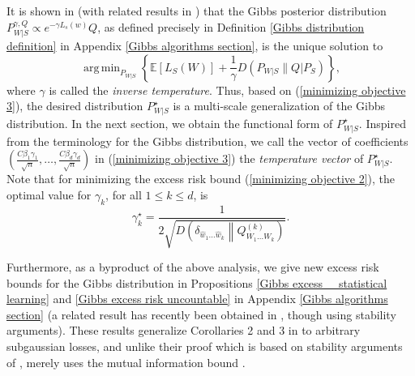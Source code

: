 \documentclass{article}
\DeclareMathOperator*{\argmin}{arg\,min}
\newcommand{\E}{\mathbb{E}}
\begin{document}
It is shown in \cite{xu2017information} (with related results in \cite{zhang2006information, rigollet2012sparse})  that the Gibbs posterior distribution $P^{\gamma,Q}_{W|S}\propto e^{-\gamma L_s(w)}Q$, as defined precisely 
in Definition \ref{Gibbs distribution definition} 
in Appendix \ref{Gibbs algorithms section}, is the unique solution to 
\begin{equation}\nonumber
	\argmin_{P_{W|S}}\left\{\E[L_S(W)]+\frac{1}{\gamma}D(P_{W|S}\|Q|P_S)\right\},
\end{equation}
where $\gamma$ is called the \emph{inverse temperature}.
Thus, based on (\ref{minimizing objective 3}), the desired distribution $P^{\star}_{W|S}$ is a multi-scale generalization of the Gibbs distribution. In the next section, we obtain the functional form of $P^{\star}_{W|S}$.
Inspired from the terminology for the Gibbs distribution, we call the vector of coefficients $\left(\frac{C\beta_1\gamma_1}{\sqrt{n}},\dots,\frac{C\beta_d\gamma_d}{\sqrt{n}}\right) $ in (\ref{minimizing objective 3}) the \emph{temperature vector} of $P^{\star}_{W|S}$.
Note that for minimizing the excess risk bound (\ref{minimizing objective 2}), the optimal value for $\gamma_k$, for all $1\leq k\leq d$, is
\begin{equation*}
	\gamma_k^{\star}=\frac{1}{2\sqrt{D\left(\delta_{\widehat{w}_1 \dots \widehat{w}_k}\middle\|Q^{(k)}_{W_1\dots W_k}\right)}}.
\end{equation*}

Furthermore, as a byproduct of the above analysis, we give new excess risk bounds for the Gibbs distribution in Propositions \ref{Gibbs excess _ statistical learning} and \ref{Gibbs excess risk uncountable} 
in Appendix \ref{Gibbs algorithms section} (a related result has recently been obtained in \cite{kuzborskij2019distribution}, though using stability arguments). These results generalize Corollaries 2 and 3 in \cite{xu2017information} to arbitrary subgaussian losses, and unlike their proof which is based on stability arguments of \cite{raginsky2016information}, merely uses the mutual information bound \cite{russo2016controlling,  xu2017information}.
\end{document}
